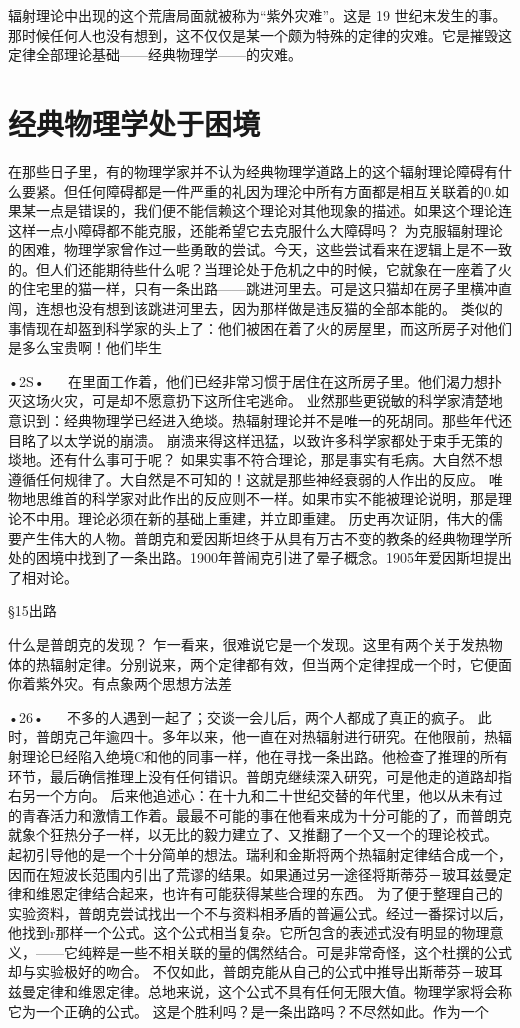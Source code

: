 辐射理论中出现的这个荒唐局面就被称为“紫外灾难”。这是 19 世纪末发生的事。那时候任何人也没有想到，这不仅仅是某一个颇为特殊的定律的灾难。它是摧毁这定律全部理论基础——经典物理学——的灾难。

\section{经典物理学处于困境}

在那些日子里，有的物理学家并不认为经典物理学道路上的这个辐射理论障碍有什么要紧。但任何障碍都是一件严重的礼因为理沦中所有方面都是相互关联着的0.如果某一点是错误的，我们便不能信赖这个理论对其他现象的描述。如果这个理论连这样一点小障碍都不能克服，还能希望它去克服什么大障碍吗？
为克服辐射理论的困难，物理学家曾作过一些勇敢的尝试。今天，这些尝试看来在逻辑上是不一致的。但人们还能期待些什么呢？当理论处于危机之中的时候，它就象在一座着了火的住宅里的猫一样，只有一条出路——跳进河里去。可是这只猫却在房子里横冲直闯，连想也没有想到该跳进河里去，因为那样做是违反猫的全部本能的。
类似的事情现在却盔到科学家的头上了：他们被困在着了火的房屋里，而这所房子对他们是多么宝贵啊！他们毕生

•2S•
  
在里面工作着，他们已经非常习惯于居住在这所房子里。他们渴力想扑灭这场火灾，可是却不愿意扔下这所住宅逃命。
业然那些更锐敏的科学家清楚地意识到：经典物理学已经进入绝埮。热辐射理论并不是唯一的死胡同。那些年代还目眳了以太学说的崩溃。
崩溃来得这样迅猛，以致许多科学家都处于束手无策的埮地。还有什么事可于呢？
如果实事不符合理论，那是事实有毛病。大自然不想遵循任何规律了。大自然是不可知的！这就是那些神经衰弱的人作出的反应。
唯物地思维首的科学家对此作出的反应则不一样。如果市实不能被理论说明，那是理论不中用。理论必须在新的基础上重建，并立即重建。
历史再次证阴，伟大的儒要产生伟大的人物。普朗克和爱因斯坦终于从具有万古不变的教条的经典物理学所处的困境中找到了一条出路。1900年普闹克引进了晕子概念。1905年爱因斯坦提出了相对论。

§15出路

什么是普朗克的发现？
乍一看来，很难说它是一个发现。这里有两个关于发热物体的热辐射定律。分别说来，两个定律都有效，但当两个定律捏成一个时，它便面你着紫外灾。有点象两个思想方法差

•26•
  
不多的人遇到一起了；交谈一会儿后，两个人都成了真正的疯子。
此时，普朗克己年逾四十。多年以来，他一直在对热辐射进行研究。在他限前，热辐射理论巳经陷入绝境C和他的同事一样，他在寻找一条出路。他检查了推理的所有环节，最后确信推理上没有任何错识。普朗克继续深入研究，可是他走的道路却指右另一个方向。
后来他追述心：在十九和二十世纪交替的年代里，他以从未有过的青春活力和激情工作着。最最不可能的事在他看来成为十分可能的了，而普朗克就象个狂热分子一样，以无比的毅力建立了、又推翻了一个又一个的理论校式。
起初引导他的是一个十分简单的想法。瑞利和金斯将两个热辐射定律结合成一个，因而在短波长范围内引出了荒谬的结果。如果通过另一途径将斯蒂芬－玻耳兹曼定律和维恩定律结合起来，也许有可能获得某些合理的东西。
为了便于整理自己的实验资料，普朗克尝试找出一个不与资料相矛盾的普遍公式。经过一番探讨以后，他找到r那样一个公式。这个公式相当复杂。它所包含的表述式没有明显的物理意义，——它纯粹是一些不相关联的量的偶然结合。可是非常奇怪，这个杜撰的公式却与实验极好的吻合。
不仅如此，普朗克能从自己的公式中推导出斯蒂芬－玻耳兹曼定律和维恩定律。总地来说，这个公式不具有任何无限大值。物理学家将会称它为一个正确的公式。
这是个胜利吗？是一条出路吗？不尽然如此。作为一个


